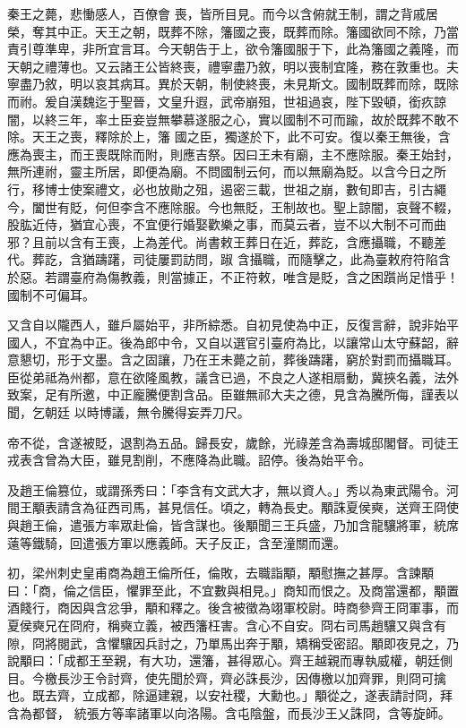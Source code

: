 \begin{pinyinscope}
 秦王之薨，悲慟感人，百僚會
 喪，皆所目見。而今以含俯就王制，謂之背戚居榮，奪其中正。天王之朝，既葬不除，籓國之喪，既葬而除。籓國欲同不除，乃當責引尊準卑，非所宜言耳。今天朝告于上，欲令籓國服于下，此為籓國之義隆，而天朝之禮薄也。又云諸王公皆終喪，禮寧盡乃敘，明以喪制宜隆，務在敦重也。夫寧盡乃敘，明以哀其病耳。異於天朝，制使終喪，未見斯文。國制既葬而除，既除而祔。爰自漢魏迄于聖晉，文皇升遐，武帝崩殂，世祖過哀，陛下毀頓，銜疚諒闇，以終三年，率土臣妾豈無攀慕遂服之心，實以國制不可而踰，故於既葬不敢不除。天王之喪，釋除於上，籓
 國之臣，獨遂於下，此不可安。復以秦王無後，含應為喪主，而王喪既除而附，則應吉祭。因曰王未有廟，主不應除服。秦王始封，無所連祔，靈主所居，即便為廟。不問國制云何，而以無廟為貶。以含今日之所行，移博士使案禮文，必也放勛之殂，遏密三載，世祖之崩，數旬即吉，引古繩今，闔世有貶，何但李含不應除服。今也無貶，王制故也。聖上諒闇，哀聲不輟，股肱近侍，猶宜心喪，不宜便行婚娶歡樂之事，而莫云者，豈不以大制不可而曲邪？且前以含有王喪，上為差代。尚書敕王葬日在近，葬訖，含應攝職，不聽差代。葬訖，含猶躊躇，司徒屢罰訪問，踧
 含攝職，而隨擊之，此為臺敕府符陷含於惡。若謂臺府為傷教義，則當據正，不正符敕，唯含是貶，含之困躓尚足惜乎！國制不可偏耳。



 又含自以隴西人，雖戶屬始平，非所綜悉。自初見使為中正，反復言辭，說非始平國人，不宜為中正。後為郎中令，又自以選官引臺府為比，以讓常山太守蘇韶，辭意懇切，形于文墨。含之固讓，乃在王未薨之前，葬後躊躇，窮於對罰而攝職耳。臣從弟祗為州都，意在欲隆風教，議含已過，不良之人遂相扇動，冀挾名義，法外致案，足有所邀，中正龐騰便割含品。臣雖無祁大夫之德，見含為騰所侮，謹表以聞，乞朝廷
 以時博議，無令騰得妄弄刀尺。



 帝不從，含遂被貶，退割為五品。歸長安，歲餘，光祿差含為壽城邸閣督。司徒王戎表含曾為大臣，雖見割削，不應降為此職。詔停。後為始平令。



 及趙王倫篡位，或謂孫秀曰：「李含有文武大才，無以資人。」秀以為東武陽令。河間王顒表請含為征西司馬，甚見信任。頃之，轉為長史。顒誅夏侯奭，送齊王冏使與趙王倫，遣張方率眾赴倫，皆含謀也。後顒聞三王兵盛，乃加含龍驤將軍，統席薳等鐵騎，回遣張方軍以應義師。天子反正，含至潼關而還。



 初，梁州刺史皇甫商為趙王倫所任，倫敗，去職詣顒，顒慰撫之甚厚。含諫顒
 曰：「商，倫之信臣，懼罪至此，不宜數與相見。」商知而恨之。及商當還都，顒置酒餞行，商因與含忿爭，顒和釋之。後含被徵為翊軍校尉。時商參齊王冏軍事，而夏侯奭兄在冏府，稱奭立義，被西籓枉害。含心不自安。冏右司馬趙驤又與含有隙，冏將閱武，含懼驤因兵討之，乃單馬出奔于顒，矯稱受密詔。顒即夜見之，乃說顒曰：「成都王至親，有大功，還籓，甚得眾心。齊王越親而專執威權，朝廷側目。今檄長沙王令討齊，使先聞於齊，齊必誅長沙，因傳檄以加齊罪，則冏可擒也。既去齊，立成都，除逼建親，以安社稷，大勳也。」顒從之，遂表請討冏，拜含為都督，
 統張方等率諸軍以向洛陽。含屯陰盤，而長沙王乂誅冏，含等旋師。




\end{pinyinscope}
